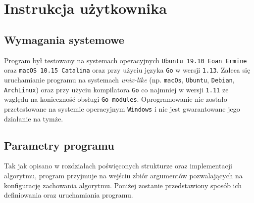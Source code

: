 \chapter{Instrukcja użytkownika}
\thispagestyle{chapterBeginStyle}
\label{rozdzial4}

\section{Wymagania systemowe}

Program był testowany na systemach operacyjnych \texttt{Ubuntu 19.10 Eoan Ermine} oraz \texttt{macOS 10.15 Catalina} oraz przy użyciu języka \texttt{Go} w wersji \texttt{1.13}. Zaleca się uruchamianie programu na systemach \textit{unix-like} (np. \texttt{macOs}, \texttt{Ubuntu}, \texttt{Debian}, \texttt{ArchLinux}) oraz przy użyciu kompilatora \texttt{Go} co najmniej w wersji \texttt{1.11} ze względu na konieczność obsługi \texttt{Go modules}. Oprogramowanie nie zostało przetestowane na systemie operacyjnym \texttt{Windows} i nie jest gwarantowane jego działanie na tymże. 

\section{Parametry programu}
Tak jak opisano w rozdziałach poświęconych strukturze oraz implementacji algorytmu, program przyjmuje na wejściu zbiór argumentów pozwalających na konfigurację zachowania algorytmu. Poniżej zostanie przedstawiony sposób ich definiowania oraz uruchamiania programu. 

